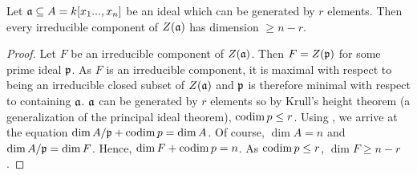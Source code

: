 \label{1.1.9}

Let $\mathfrak a \subseteq A = k[x_1 ... ,x_n]$ be an ideal which can be generated by $r$ elements. Then every irreducible component of $Z(\mathfrak a)$ has dimension $ \geq n - r$.

\begin{proof}
    Let $F$ be an irreducible component of $Z(\mathfrak a)$. Then $F = Z(\mathfrak p)$ for some prime ideal $\mathfrak p$. As $F$ is an irreducible component, it is maximal with respect to being an irreducible closed subset of $Z(\mathfrak a)$ and $\mathfrak p$ is therefore minimal with respect to containing $\mathfrak a$. $\mathfrak a$ can be generated by $r$ elements so by Krull's height theorem (a generalization of the principal ideal theorem), $\operatorname{codim} p \leq r$. Using \cite[13.4]{eisenbudcommutative}, we arrive at the equation $\dim A/\mathfrak p + \operatorname{codim} p = \dim A$. Of course, $\dim A = n$ and $\dim A/\mathfrak p = \dim F$. Hence, $\dim F + \operatorname{codim} p = n$. As $\operatorname{codim} p \leq r$, $\dim F \geq n - r$.
\end{proof}